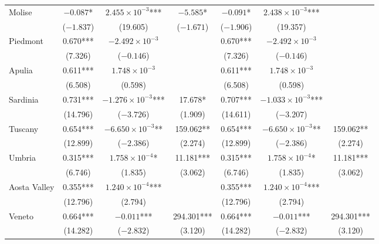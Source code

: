 \documentclass[12pt]{article}
\begin{document}
\begin{appendices}
\begin{longtable}{@{}lcccccc@{}}
            Molise & $-0.087$* & $2.455 \times 10^{-3}$*** & $-5.585$* & $-0.091$* & $2.438 \times 10^{-3}$*** &  \\ 
             & ($-1.837$) & (19.605) & ($-1.671$) & ($-1.906$) & (19.357) &  \\ 
            Piedmont & 0.670*** & $-2.492 \times 10^{-3}$ &  & 0.670*** & $-2.492 \times 10^{-3}$ &  \\ 
             & (7.326) & ($-0.146$) &  & (7.326) & ($-0.146$) &  \\ 
            Apulia & 0.611*** & $1.748 \times 10^{-3}$ &  & 0.611*** & $1.748 \times 10^{-3}$ &  \\ 
             & (6.508) & (0.598) &  & (6.508) & (0.598) &  \\ 
            Sardinia & 0.731*** & $-1.276 \times 10^{-3}$*** & 17.678* & 0.707*** & $-1.033 \times 10^{-3}$*** &  \\ 
             & (14.796) & ($-3.726$) & (1.909) & (14.611) & ($-3.207$) &  \\ 
            Tuscany & 0.654*** & $-6.650 \times 10^{-3}$** & 159.062** & 0.654*** & $-6.650 \times 10^{-3}$** & 159.062** \\ 
             & (12.899) & ($-2.386$) & (2.274) & (12.899) & ($-2.386$) & (2.274) \\ 
            Umbria & 0.315*** & $1.758 \times 10^{-4}$* & 11.181*** & 0.315*** & $1.758 \times 10^{-4}$* & 11.181*** \\ 
             & (6.746) & (1.835) & (3.062) & (6.746) & (1.835) & (3.062) \\ 
            Aosta Valley & 0.355*** & $1.240 \times 10^{-4}$*** &  & 0.355*** & $1.240 \times 10^{-4}$*** &  \\ 
             & (12.796) & (2.794) &  & (12.796) & (2.794) &  \\ 
            Veneto & 0.664*** & $-0.011$*** & 294.301*** & 0.664*** & $-0.011$*** & 294.301*** \\ 
             & (14.282) & ($-2.832$) & (3.120) & (14.282) & ($-2.832$) & (3.120) \\* \bottomrule
    	\end{longtable}
		
        

\end{appendices}
\end{document}
